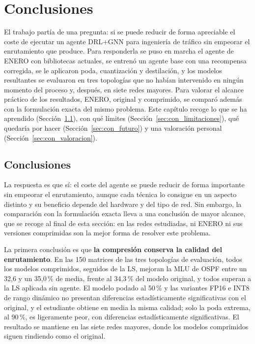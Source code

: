 \chapter{Conclusiones}\label{cap:con}

El trabajo partía de una pregunta: si se puede reducir de forma apreciable el coste de ejecutar un agente DRL+GNN para ingeniería de tráfico sin empeorar el enrutamiento que produce. Para responderla se puso en marcha el agente de ENERO con bibliotecas actuales, se entrenó un agente base con una recompensa corregida, se le aplicaron poda, cuantización y destilación, y los modelos resultantes se evaluaron en tres topologías que no habían intervenido en ningún momento del proceso y, después, en siete redes mayores. Para valorar el alcance práctico de los resultados, ENERO, original y comprimido, se comparó además con la formulación exacta del mismo problema. Este capítulo recoge lo que se ha aprendido (Sección~\ref{sec:con_conclusiones}), con qué límites (Sección~\ref{sec:con_limitaciones}), qué quedaría por hacer (Sección~\ref{sec:con_futuro}) y una valoración personal (Sección~\ref{sec:con_valoracion}).

\section{Conclusiones}\label{sec:con_conclusiones}

La respuesta es que sí: el coste del agente se puede reducir de forma importante sin empeorar el enrutamiento, aunque cada técnica lo consigue en un aspecto distinto y su beneficio depende del hardware y del tipo de red. Sin embargo, la comparación con la formulación exacta lleva a una conclusión de mayor alcance, que se recoge al final de esta sección: en las redes estudiadas, ni ENERO ni sus versiones comprimidas son la mejor forma de resolver este problema.

La primera conclusión es que \textbf{la compresión conserva la calidad del enrutamiento}. En las 150 matrices de las tres topologías de evaluación, todos los modelos comprimidos, seguidos de la LS, mejoran la MLU de OSPF entre un 32,6 y un 35,0\,\% de media, frente al 34,3\,\% del modelo original, y todos superan a la LS aplicada sin agente. El modelo podado al 50\,\% y las variantes FP16 e INT8 de rango dinámico no presentan diferencias estadísticamente significativas con el original, y el estudiante obtiene en media la misma calidad; solo la poda extrema, al 90\,\%, es ligeramente peor, con diferencias estadísticamente significativas. El resultado se mantiene en las siete redes mayores, donde los modelos comprimidos siguen rindiendo como el original.

